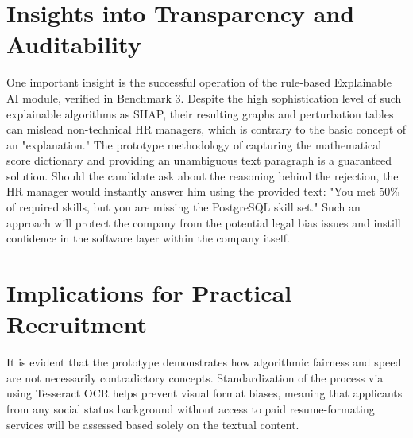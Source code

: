 \section{Insights into Transparency and Auditability}
One important insight is the successful operation of the rule-based Explainable AI module, verified in Benchmark 3. Despite the high sophistication level of such explainable algorithms as SHAP, their resulting graphs and perturbation tables can mislead non-technical HR managers, which is contrary to the basic concept of an "explanation." The prototype methodology of capturing the mathematical score dictionary and providing an unambiguous text paragraph is a guaranteed solution. Should the candidate ask about the reasoning behind the rejection, the HR manager would instantly answer him using the provided text: "You met 50\% of required skills, but you are missing the PostgreSQL skill set." Such an approach will protect the company from the potential legal bias issues and instill confidence in the software layer within the company itself.

\section{Implications for Practical Recruitment}
It is evident that the prototype demonstrates how algorithmic fairness and speed are not necessarily contradictory concepts. Standardization of the process via using Tesseract OCR helps prevent visual format biases, meaning that applicants from any social status background without access to paid resume-formating services will be assessed based solely on the textual content.
